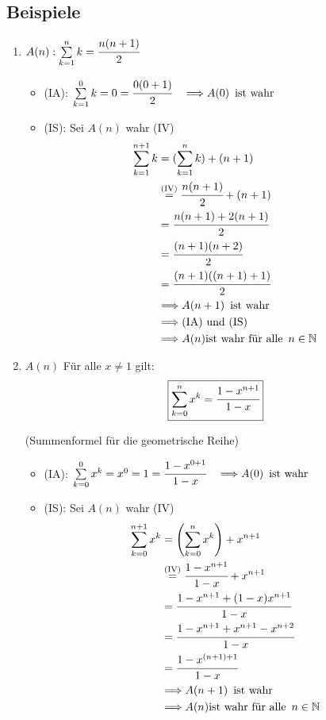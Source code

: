 \subsection{Beispiele}
\begin{enumerate}
\item
\( A(n): \sum \limits_{k=1}^{n} k= \cfrac{n(n+1)}{2} \)
\begin{itemize}
\item (IA): \( \sum \limits_{k=1}^{0} k = 0 = \cfrac{0(0+1)}{2} \quad \Longrightarrow A(0) \enspace \text{ist wahr} \)
\item (IS): Sei \(A(n)\) wahr (IV)
\begin{align*}
\sum \limits_{k=1}^{n+1}k &= (\sum \limits_{k=1}^{n} k ) + (n+1) \\
&\overset{\text{(IV)}}{=} \cfrac{n(n+1)}{2} + (n+1) \\
&= \cfrac{n(n+1)+2(n+1)}{2} \\
&= \cfrac{(n+1)(n+2)}{2} \\
&= \cfrac{(n+1)((n+1)+1)}{2} \\
&\Longrightarrow A(n+1) \enspace \text{ist wahr} \\
&\Longrightarrow \text{(IA) und (IS)} \\
&\Longrightarrow A(n) \text{ist wahr für alle} \enspace n \in \mathbb{N}
\end{align*}
\end{itemize}
\item \(A(n)\) Für alle \(x \not= 1 \) gilt:
\[
\boxed{\sum \limits_{k=0}^{n} x^k = \cfrac{1-x^{n+1}}{1-x}}
\]
\centerline{(Summenformel für die geometrische Reihe)}
\begin{itemize}
\item (IA): \( \sum \limits_{k=0}^{0} x^k = x^0 = 1 = \cfrac{1-x^{0+1}}{1-x} \quad \Longrightarrow A(0) \enspace \text{ist wahr} \)
\item (IS): Sei \(A(n)\) wahr (IV)
\begin{align*}
\sum \limits_{k=0}^{n+1}x^k  &= \left(\sum \limits_{k=0}^{n} x^k  \right) + x^{n+1} \\
&\overset{\text{(IV)}}{=} \cfrac{1-x^{n+1}}{1-x} + x^{n+1} \\
&= \cfrac{1-x^{n+1} + (1-x)x^{n+1}}{1-x} \\
&=  \cfrac{1-x^{n+1} +x^{n+1}-x^{n+2}}{1-x}\\
&=  \cfrac{1-x^{(n+1)+1}}{1-x}\\
&\Longrightarrow A(n+1) \enspace \text{ist wahr} \\
&\Longrightarrow A(n) \text{ist wahr für alle} \enspace n \in \mathbb{N}
\end{align*}
\end{itemize}
\end{enumerate}
